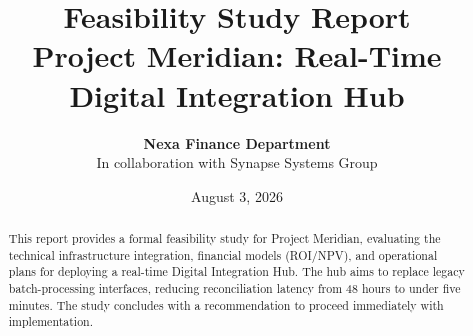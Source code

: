 \documentclass[11pt,a4paper]{article}
\title{\color{primary}\Huge\bfseries Feasibility Study Report \\ \Large Project Meridian: Real-Time Digital Integration Hub}
\author{\textbf{Nexa Finance Department} \\ In collaboration with Synapse Systems Group}
\date{August 3, 2026}
\begin{document}
\maketitle

\begin{abstract}
This report provides a formal feasibility study for Project Meridian, evaluating the technical infrastructure integration, financial models (ROI/NPV), and operational plans for deploying a real-time Digital Integration Hub. The hub aims to replace legacy batch-processing interfaces, reducing reconciliation latency from 48 hours to under five minutes. The study concludes with a recommendation to proceed immediately with implementation.
\end{abstract}

\vspace{1em}
\tableofcontents
\newpage








\vspace{1.5em}


\end{document}
